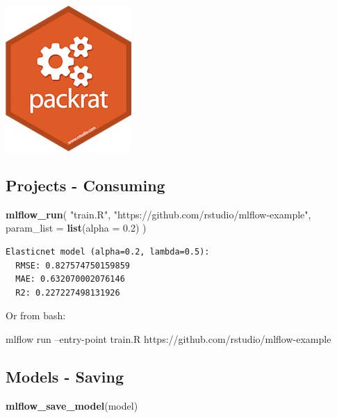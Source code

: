 \documentclass[]{article}
\newenvironment{Shaded}{\begin{snugshade}}{\end{snugshade}}
\newcommand{\DataTypeTok}[1]{\textcolor[rgb]{0.13,0.29,0.53}{#1}}
\newcommand{\ExtensionTok}[1]{#1}
\newcommand{\FloatTok}[1]{\textcolor[rgb]{0.00,0.00,0.81}{#1}}
\newcommand{\KeywordTok}[1]{\textcolor[rgb]{0.13,0.29,0.53}{\textbf{#1}}}
\newcommand{\NormalTok}[1]{#1}
\newcommand{\StringTok}[1]{\textcolor[rgb]{0.31,0.60,0.02}{#1}}
\begin{document}
\includegraphics{images/r-package-packrat.png}

\hypertarget{projects---consuming}{%
\subsection{Projects - Consuming}\label{projects---consuming}}

\begin{Shaded}
\begin{Highlighting}[]
\KeywordTok{mlflow_run}\NormalTok{(}
  \StringTok{"train.R"}\NormalTok{,}
  \StringTok{"https://github.com/rstudio/mlflow-example"}\NormalTok{,}
  \DataTypeTok{param_list =} \KeywordTok{list}\NormalTok{(}\DataTypeTok{alpha =} \FloatTok{0.2}\NormalTok{)}
\NormalTok{)}
\end{Highlighting}
\end{Shaded}

\begin{verbatim}
Elasticnet model (alpha=0.2, lambda=0.5):
  RMSE: 0.827574750159859
  MAE: 0.632070002076146
  R2: 0.227227498131926
\end{verbatim}

Or from bash:

\begin{Shaded}
\begin{Highlighting}[]
\ExtensionTok{mlflow}\NormalTok{ run --entry-point train.R https://github.com/rstudio/mlflow-example}
\end{Highlighting}
\end{Shaded}

\hypertarget{models---saving}{%
\subsection{Models - Saving}\label{models---saving}}

\begin{Shaded}
\begin{Highlighting}[]
\KeywordTok{mlflow_save_model}\NormalTok{(model)}
\end{Highlighting}
\end{Shaded}
\end{document}
